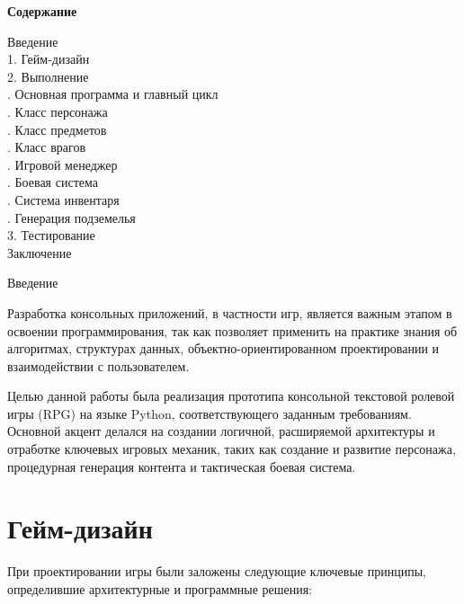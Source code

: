 \documentclass[]{vvsu}
\begin{document}
\begin{center}
\textbf{\large Содержание}
\end{center}
\noindent
Введение \\
1. Гейм-дизайн \\
2. Выполнение \\
. Основная программа и главный цикл \\
. Класс персонажа \\
. Класс предметов \\
. Класс врагов \\
. Игровой менеджер \\
. Боевая система \\
. Система инвентаря \\
. Генерация подземелья \\
3. Тестирование \\
Заключение \\
\vspace{2em}

\newpage
\begin{center}
{\Large Введение}
\end{center}
\vspace{1em}

Разработка консольных приложений, в частности игр, является важным этапом в освоении программирования, так как позволяет применить на практике знания об алгоритмах, структурах данных, объектно-ориентированном проектировании и взаимодействии с пользователем.

Целью данной работы была реализация прототипа консольной текстовой ролевой игры (RPG) на языке Python, соответствующего заданным требованиям. Основной акцент делался на создании логичной, расширяемой архитектуры и отработке ключевых игровых механик, таких как создание и развитие персонажа, процедурная генерация контента и тактическая боевая система.


\section{Гейм-дизайн}

При проектировании игры были заложены следующие ключевые принципы, определившие архитектурные и программные решения:
\end{document}
